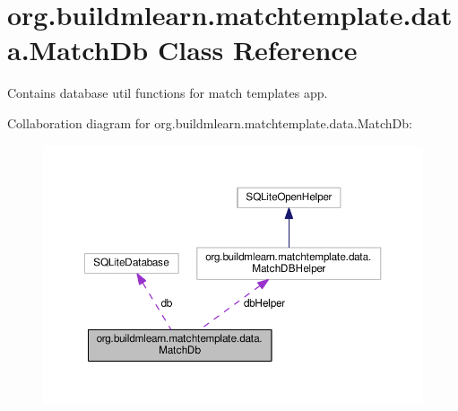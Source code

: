\hypertarget{classorg_1_1buildmlearn_1_1matchtemplate_1_1data_1_1MatchDb}{}\section{org.\+buildmlearn.\+matchtemplate.\+data.\+Match\+Db Class Reference}
\label{classorg_1_1buildmlearn_1_1matchtemplate_1_1data_1_1MatchDb}


Contains database util functions for match template\textquotesingle{}s app.  




Collaboration diagram for org.\+buildmlearn.\+matchtemplate.\+data.\+Match\+Db\+:
\nopagebreak
\begin{figure}[H]
\begin{center}
\leavevmode
\includegraphics[width=350pt]{classorg_1_1buildmlearn_1_1matchtemplate_1_1data_1_1MatchDb__coll__graph}
\end{center}
\end{figure}
